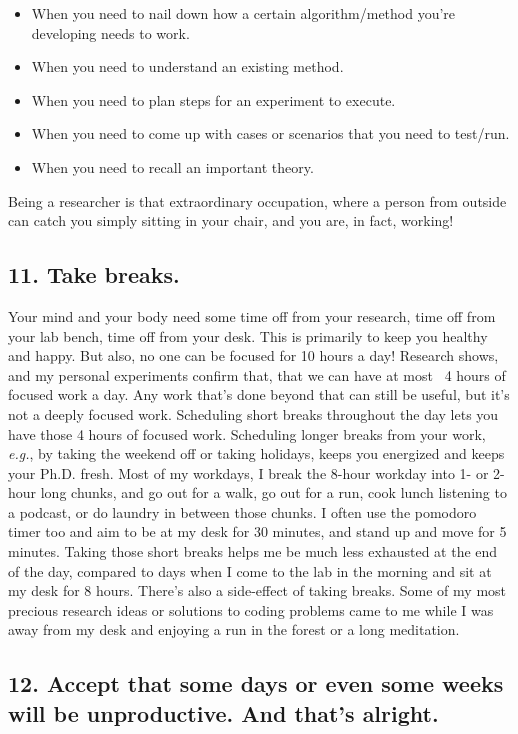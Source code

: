 \documentclass[10pt,twocolumn]{article}
\begin{document}
\begin{itemize}
\item When you need to nail down how a certain algorithm/method you’re developing needs to work.
\item When you need to understand an existing method.
\item When you need to plan steps for an experiment to execute.
\item When you need to come up with cases or scenarios that you need to test/run.
\item When you need to recall an important theory.
\end{itemize}

Being a researcher is that extraordinary occupation, where a person from outside can catch you simply sitting in your chair, and you are, in fact, working!

\subsection*{11. Take breaks.}

Your mind and your body need some time off from your research, time off from your lab bench, time off from your desk. This is primarily to keep you healthy and happy. But also, no one can be focused for 10 hours a day! Research shows, and my personal experiments confirm that, that we can have at most ~4 hours of focused work a day. Any work that’s done beyond that can still be useful, but it’s not a deeply focused work. Scheduling short breaks throughout the day lets you have those 4 hours of focused work. Scheduling longer breaks from your work, \textit{e.g.}, by taking the weekend off or taking holidays, keeps you energized and keeps your Ph.D. fresh. Most of my workdays, I break the 8-hour workday into 1- or 2-hour long chunks, and go out for a walk, go out for a run, cook lunch listening to a podcast, or do laundry in between those chunks. I often use the pomodoro timer too and aim to be at my desk for 30 minutes, and stand up and move for 5 minutes. Taking those short breaks helps me be much less exhausted at the end of the day, compared to days when I come to the lab in the morning and sit at my desk for 8 hours. There’s also a side-effect of taking breaks. Some of my most precious research ideas or solutions to coding problems came to me while I was away from my desk and enjoying a run in the forest or a long meditation.

\subsection*{12. Accept that some days or even some weeks will be unproductive. And that’s alright.}
\end{document}
